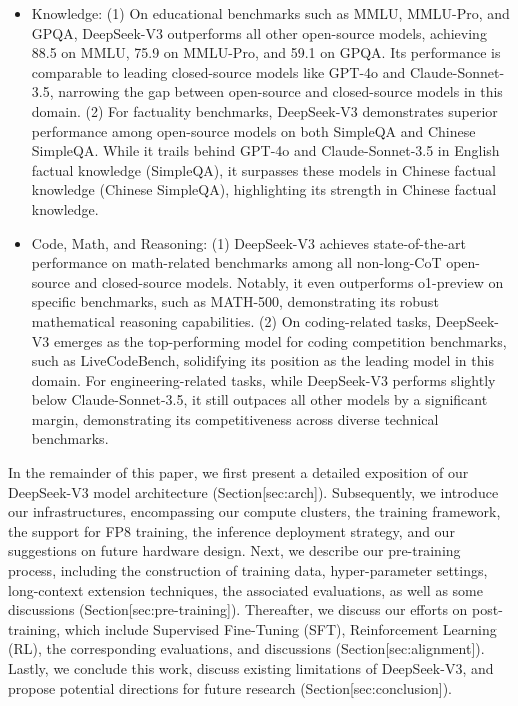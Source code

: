 \documentclass[11pt,a4paper]{article}
\begin{document}
\begin{itemize}
\item Knowledge: (1) On educational benchmarks such as MMLU, MMLU-Pro, and GPQA, DeepSeek-V3 outperforms all other open-source models, achieving 88.5 on MMLU, 75.9 on MMLU-Pro, and 59.1 on GPQA. Its performance is comparable to leading closed-source models like GPT-4o and Claude-Sonnet-3.5, narrowing the gap between open-source and closed-source models in this domain. (2) For factuality benchmarks, DeepSeek-V3 demonstrates superior performance among open-source models on both SimpleQA and Chinese SimpleQA. While it trails behind GPT-4o and Claude-Sonnet-3.5 in English factual knowledge (SimpleQA), it surpasses these models in Chinese factual knowledge (Chinese SimpleQA), highlighting its strength in Chinese factual knowledge.
\item Code, Math, and Reasoning: (1) DeepSeek-V3 achieves state-of-the-art performance on math-related benchmarks among all non-long-CoT open-source and closed-source models. Notably, it even outperforms o1-preview on specific benchmarks, such as MATH-500, demonstrating its robust mathematical reasoning capabilities. (2) On coding-related tasks, DeepSeek-V3 emerges as the top-performing model for coding competition benchmarks, such as LiveCodeBench, solidifying its position as the leading model in this domain. For engineering-related tasks, while DeepSeek-V3 performs slightly below Claude-Sonnet-3.5, it still outpaces all other models by a significant margin, demonstrating its competitiveness across diverse technical benchmarks.
\end{itemize}

In the remainder of this paper, we first present a detailed exposition of our DeepSeek-V3 model architecture (Section[sec:arch]). Subsequently, we introduce our infrastructures, encompassing our compute clusters, the training framework, the support for FP8 training, the inference deployment strategy, and our suggestions on future hardware design. Next, we describe our pre-training process, including the construction of training data, hyper-parameter settings, long-context extension techniques, the associated evaluations, as well as some discussions (Section[sec:pre-training]). Thereafter, we discuss our efforts on post-training, which include Supervised Fine-Tuning (SFT), Reinforcement Learning (RL), the corresponding evaluations, and discussions (Section[sec:alignment]). Lastly, we conclude this work, discuss existing limitations of DeepSeek-V3, and propose potential directions for future research (Section[sec:conclusion]).
\end{document}
